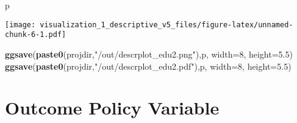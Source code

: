 \documentclass[
]{article}
\newenvironment{Shaded}{\begin{snugshade}}{\end{snugshade}}
\newcommand{\DataTypeTok}[1]{\textcolor[rgb]{0.13,0.29,0.53}{#1}}
\newcommand{\DecValTok}[1]{\textcolor[rgb]{0.00,0.00,0.81}{#1}}
\newcommand{\FloatTok}[1]{\textcolor[rgb]{0.00,0.00,0.81}{#1}}
\newcommand{\KeywordTok}[1]{\textcolor[rgb]{0.13,0.29,0.53}{\textbf{#1}}}
\newcommand{\NormalTok}[1]{#1}
\newcommand{\StringTok}[1]{\textcolor[rgb]{0.31,0.60,0.02}{#1}}
\begin{document}
\begin{Shaded}
\begin{Highlighting}[]
\NormalTok{p}
\end{Highlighting}
\end{Shaded}

\texttt{[image: visualization\_1\_descriptive\_v5\_files/figure-latex/unnamed-chunk-6-1.pdf]}

\begin{Shaded}
\begin{Highlighting}[]
\KeywordTok{ggsave}\NormalTok{(}\KeywordTok{paste0}\NormalTok{(projdir,}\StringTok{"/out/descrplot_edu2.png"}\NormalTok{),p, }\DataTypeTok{width=}\DecValTok{8}\NormalTok{, }\DataTypeTok{height=}\FloatTok{5.5}\NormalTok{)}
\KeywordTok{ggsave}\NormalTok{(}\KeywordTok{paste0}\NormalTok{(projdir,}\StringTok{"/out/descrplot_edu2.pdf"}\NormalTok{),p, }\DataTypeTok{width=}\DecValTok{8}\NormalTok{, }\DataTypeTok{height=}\FloatTok{5.5}\NormalTok{)}
\end{Highlighting}
\end{Shaded}

\hypertarget{outcome-policy-variable}{%
\section{Outcome Policy Variable}\label{outcome-policy-variable}}
\end{document}
